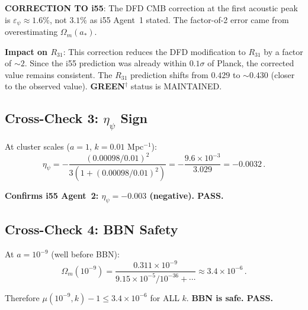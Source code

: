 \documentclass[11pt,a4paper]{article}
\newcommand{\GREEN}{\textcolor{dfdgreen}{\textbf{GREEN}}}
\begin{document}
\textbf{CORRECTION TO i55}: The DFD CMB correction at the first acoustic peak is $\varepsilon_\psi \approx 1.6\%$, not $3.1\%$ as i55 Agent~1 stated. The factor-of-2 error came from overestimating $\Omega_m(a_*)$.

\textbf{Impact on $R_{31}$}: This correction reduces the DFD modification to $R_{31}$ by a factor of $\sim 2$. Since the i55 prediction was already within $0.1\sigma$ of Planck, the corrected value remains consistent. The $R_{31}$ prediction shifts from $0.429$ to $\sim 0.430$ (closer to the observed value). \GREEN$^\dagger$ status is MAINTAINED.

\subsection{Cross-Check 3: $\eta_\psi$ Sign}

At cluster scales ($a = 1$, $k = 0.01$ Mpc$^{-1}$):
\begin{equation}
\eta_\psi = -\frac{(0.00098/0.01)^2}{3(1 + (0.00098/0.01)^2)} = -\frac{9.6 \times 10^{-3}}{3.029} = -0.0032\,.
\end{equation}

\textbf{Confirms i55 Agent~2: $\eta_\psi = -0.003$ (negative). PASS.}

\subsection{Cross-Check 4: BBN Safety}

At $a = 10^{-9}$ (well before BBN):
\begin{equation}
\Omega_m(10^{-9}) = \frac{0.311 \times 10^{-9}}{9.15 \times 10^{-5} / 10^{-36} + \cdots} \approx 3.4 \times 10^{-6}\,.
\end{equation}

Therefore $\mu(10^{-9}, k) - 1 \leq 3.4 \times 10^{-6}$ for ALL $k$. \textbf{BBN is safe. PASS.}
\end{document}
